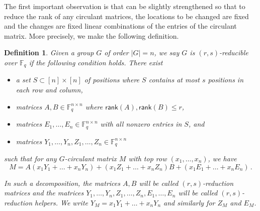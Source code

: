 \documentclass{toc}
\newtheorem{define}[theorem]{Definition}
\newcommand\F{{\mathbb{F}}}
\newcommand\rank{\textsf{rank}}
\begin{document}
The first important observation is that  can be slightly strengthened so that to reduce the rank of any circulant matrices, the locations to be changed are fixed and the changes are fixed linear combinations of the entries of the circulant matrix.  More precisely, we make the following definition.
\begin{define}\label{group_reducibility}
Given a group $G$   %
of order   %
$|G| = n$, we say $G$ is $(r,s)$-reducible over
$\F_q$ if the following %
condition holds.   %
%
%
%
%
%
%
%
%
%
%
%
%
There exist
\begin{itemize}
\item a set $S \subset [n] \times [n]$ of positions where $S$
  contains at most $s$
  positions in each row and column,
\item  matrices $A,B \in \F_q^{n\times n}$ where
   $\rank(A), \rank(B) \leq r$,
\item matrices $E_1, \dots , E_n \in \F_q^{n \times n}$ with
  all nonzero entries in $S$, and
\item matrices $Y_1, \dots , Y_n, Z_1, \dots , Z_n \in \F_q^{n \times n}$ 
\end{itemize}
such that for any $G$-circulant matrix $M$ with top row
%
$(x_1, \dots , x_n)$, we have  %
    \[
    M = A(x_1Y_1 + \dots + x_nY_n) + (x_1Z_1 + \dots + x_nZ_n)B + (x_1E_1 + \dots + x_nE_n) \,.
    \]

%
In such a decomposition, the matrices $A,B$ will be called $(r,s)$-reduction matrices and the matrices
$Y_1, \dots , Y_n,Z_1, \dots , Z_n, E_1, \dots , E_n$ will be called
$(r,s)$-reduction helpers. %
%
%
%
We write $Y_M = x_1Y_1 + \dots + x_nY_n$ and
%
similarly  %
for $Z_M$ and $E_M$.
\end{define}
\end{document}
